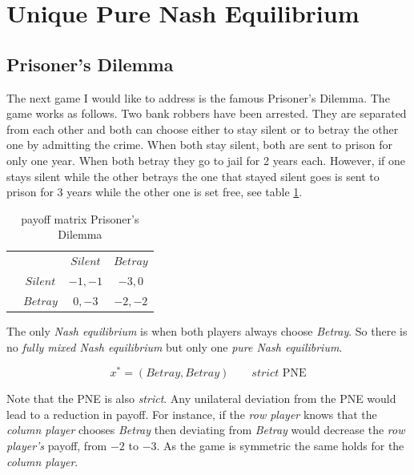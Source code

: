 \section{Unique Pure Nash Equilibrium}\label{section:uniquePureNashEquilibrium}

\subsection{Prisoner's Dilemma}\label{subsection:prisonersDilemma}

The next game I would like to address is the famous Prisoner's Dilemma. The game works as follows. Two bank robbers have been arrested. They are separated from each other and both can choose either to stay silent or to betray the other one by admitting the crime. When both stay silent, both are sent to prison for only one year. When both betray they go to jail for 2 years each. However, if one stays silent while the other betrays the one that stayed silent goes is sent to prison for 3 years while the other one is set free, see table \ref{tab:payoffPrisoners}.

\begin{table}[H]\centering
\setlength{\extrarowheight}{2pt}
\begin{tabular}{cc|c|c|}
  & \multicolumn{1}{c}{} & \multicolumn{1}{c}{$Silent$}  & \multicolumn{1}{c}{$Betray$} \\\cline{3-4}
  & $Silent$ & $-1,-1$ & $-3,0$ \\\cline{3-4}
  & $Betray$ & $0,-3$ & $-2,-2$ \\\cline{3-4}
\end{tabular}\caption{\label{tab:payoffPrisoners}payoff matrix Prisoner's Dilemma}
\end{table}

The only \textit{Nash equilibrium} is when both players always choose \textit{Betray}. So there is no \textit{fully mixed Nash equilibrium} but only one \textit{pure Nash equilibrium}. 

\begin{equation*}
    x^{*} = (Betray,Betray) \qquad \textit{strict }\text{PNE}
\end{equation*}

Note that the PNE is also \textit{strict}. Any unilateral deviation from the PNE would lead to a reduction in payoff. For instance, if the \textit{row player} knows that the \textit{column player}  chooses \textit{Betray} then deviating from \textit{Betray} would decrease the \textit{row player's} payoff, from $-2$ to $-3$. As the game is symmetric the same holds for the \textit{column player}. \\

